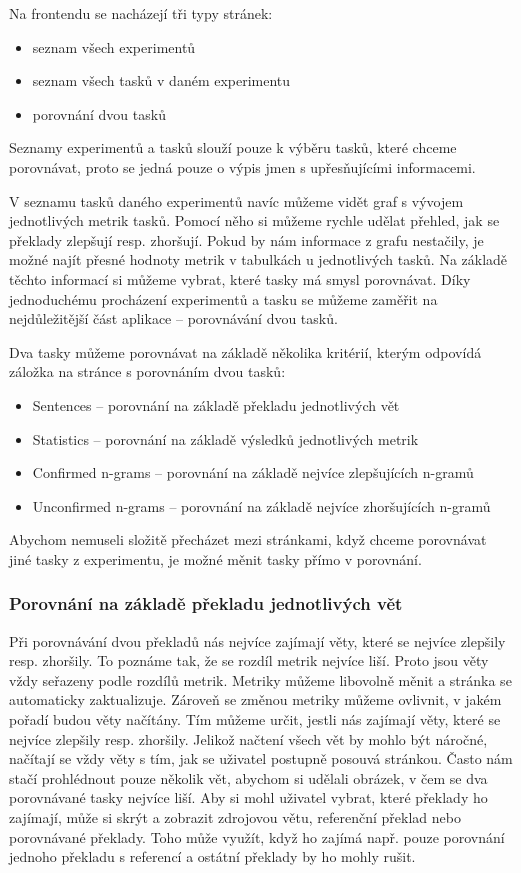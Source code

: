 Na frontendu se nacházejí tři typy stránek:
\begin{itemize}
  \item seznam všech experimentů
  \item seznam všech tasků v daném experimentu
  \item porovnání dvou tasků
\end{itemize}

Seznamy experimentů a tasků slouží pouze k výběru tasků,
  které chceme porovnávat,
  proto se jedná pouze o výpis jmen s upřesňujícími informacemi.

V seznamu tasků daného experimentů navíc můžeme vidět graf s vývojem jednotlivých metrik tasků.
Pomocí něho si můžeme rychle udělat přehled,
  jak se překlady zlepšují resp. zhoršují.
Pokud by nám informace z grafu nestačily,
  je možné najít přesné hodnoty metrik v tabulkách u jednotlivých tasků.
Na základě těchto informací si můžeme vybrat,
  které tasky má smysl porovnávat.
Díky jednoduchému procházení experimentů a tasku se můžeme zaměřit na nejdůležitější část aplikace
  -- porovnávání dvou tasků.

Dva tasky můžeme porovnávat na základě několika kritérií,
  kterým odpovídá záložka na stránce s porovnáním dvou tasků:
\begin{itemize}
  \item Sentences -- porovnání na základě překladu jednotlivých vět
  \item Statistics -- porovnání na základě výsledků jednotlivých metrik
  \item Confirmed n-grams -- porovnání na základě nejvíce zlepšujících n-gramů
  \item Unconfirmed n-grams -- porovnání na základě nejvíce zhoršujících n-gramů
\end{itemize}

Abychom nemuseli složitě přecházet mezi stránkami,
  když chceme porovnávat jiné tasky z experimentu,
  je možné měnit tasky přímo v porovnání.


\subsubsection{Porovnání na základě překladu jednotlivých vět}
Při porovnávání dvou překladů nás nejvíce zajímají věty,
  které se nejvíce zlepšily resp. zhoršily.
To poznáme tak, že se rozdíl metrik nejvíce liší. 
Proto jsou věty vždy seřazeny podle rozdílů metrik.
Metriky můžeme libovolně měnit a stránka se automaticky zaktualizuje.
Zároveň se změnou metriky můžeme ovlivnit,
  v jakém pořadí budou věty načítány.
Tím můžeme určit,
  jestli nás zajímají věty,
  které se nejvíce zlepšily resp. zhoršily.
Jelikož načtení všech vět by mohlo být náročné,
  načítají se vždy věty s tím,
  jak se uživatel postupně posouvá stránkou.
Často nám stačí prohlédnout pouze několik vět,
  abychom si udělali obrázek,
  v čem se dva porovnávané tasky nejvíce liší.
Aby si mohl uživatel vybrat,
  které překlady ho zajímají,
  může si skrýt a zobrazit zdrojovou větu, referenční překlad nebo porovnávané překlady.
Toho může využít, když ho zajímá např. pouze porovnání jednoho překladu s referencí a
  ostátní překlady by ho mohly rušit.

